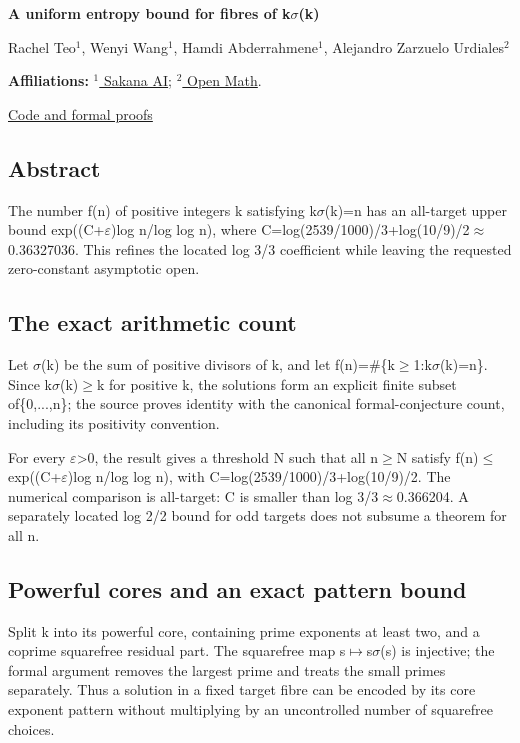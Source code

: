 \documentclass[11pt,a4paper]{article}
\begin{document}
{\LARGE\bfseries A uniform entropy bound for fibres of k\ensuremath{\sigma}(k)\par}\medskip
{\small Rachel Teo\ensuremath{^1}, Wenyi Wang\ensuremath{^1}, Hamdi Abderrahmene\ensuremath{^1}, Alejandro Zarzuelo Urdiales\ensuremath{^2}\par}\medskip
{\small\textbf{Affiliations:} \href{https://sakana.ai/}{\ensuremath{^1} Sakana AI}; \href{https://rsihouse.ai/openmath}{\ensuremath{^2} Open Math}.\par}

{\small\href{https://github.com/alejandrozu/openmath-2026-judging}{Code and formal proofs}\par}

\subsection{Abstract}
The number f(n) of positive integers k satisfying k\ensuremath{\sigma}(k)=n has an all-target upper bound exp((C+\ensuremath{\varepsilon})log n/log log n), where C=log(2539/1000)/3+log(10/9)/2\ensuremath{\approx}0.36327036. This refines the located log 3/3 coefficient while leaving the requested zero-constant asymptotic open.

\subsection{The exact arithmetic count}
Let \ensuremath{\sigma}(k) be the sum of positive divisors of k, and let f(n)=\#\{k\ensuremath{\geq}1:k\ensuremath{\sigma}(k)=n\}. Since k\ensuremath{\sigma}(k)\ensuremath{\geq}k for positive k, the solutions form an explicit finite subset of\{0,...,n\}; the source proves identity with the canonical formal-conjecture count, including its positivity convention.

For every \ensuremath{\varepsilon}>0, the result gives a threshold N such that all n\ensuremath{\geq}N satisfy f(n)\ensuremath{\leq}exp((C+\ensuremath{\varepsilon})log n/log log n), with C=log(2539/1000)/3+log(10/9)/2. The numerical comparison is all-target: C is smaller than log 3/3\ensuremath{\approx}0.366204. A separately located log 2/2 bound for odd targets does not subsume a theorem for all n.

\subsection{Powerful cores and an exact pattern bound}
Split k into its powerful core, containing prime exponents at least two, and a coprime squarefree residual part. The squarefree map s\ensuremath{\mapsto}s\ensuremath{\sigma}(s) is injective; the formal argument removes the largest prime and treats the small primes separately. Thus a solution in a fixed target fibre can be encoded by its core exponent pattern without multiplying by an uncontrolled number of squarefree choices.
\end{document}
